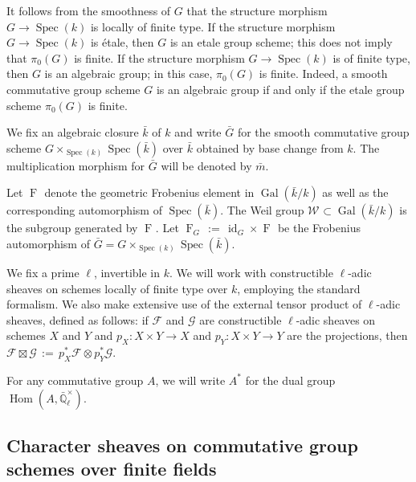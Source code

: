 \documentclass[10pt]{amsart}
\theoremstyle{plain}
\theoremstyle{definition}
\newcommand{\EE}{\mathbb{\bar Q}_\ell}
\newcommand{\bFq}{\bar{k}}
\newcommand{\Fq}{k}
\newcommand{\EEx}{\EE^\times}
\newcommand{\Weil}[1]{\mathcal{W}_{#1}}
\DeclareMathOperator{\Gal}{Gal}
\newcommand{\Frob}[1]{\operatorname{F}_{#1}}
\DeclareMathOperator{\Hom}{Hom}
\DeclareMathOperator{\id}{id}
\newcommand{\Spec}[1]{{\operatorname{Spec}(#1)}}
\newcommand{\ceq}{{\, :=\, }}
\newcommand{\bm}{\bar{m}}
\newcommand{\bG}{\bar{G}}
\begin{document}
It follows from the smoothness of $G$ that the structure morphism $G \to \Spec{\Fq}$ is locally of finite type.
If the structure morphism $G \to \Spec{\Fq}$ is \'etale, then $G$ is an etale group scheme; this does not imply that $\pi_0(G)$ is finite.
If the structure morphism $G \to \Spec{\Fq}$ is of finite type, then $G$ is an algebraic group; in this case, $\pi_0(G)$ is finite. 
Indeed, a smooth commutative group scheme $G$ is an algebraic group if and only if the etale group scheme $\pi_0(G)$ is finite.



 
We fix an algebraic closure $\bFq$ of $\Fq$ and write $\bG$ for the
smooth commutative group scheme $G \times_{\Spec{\Fq}} \Spec{\bFq}$ over $\bFq$
obtained by base change from $k$. The multiplication morphism for $\bG$ will be denoted by $\bm$.

Let $\Frob{}$ denote the geometric Frobenius element in $\Gal(\bFq/\Fq)$ as
well as the corresponding automorphism of $\Spec{\bFq}$. The Weil group
$\Weil{}\subset \Gal(\bFq/\Fq)$ is the subgroup generated by $\Frob{}$.
Let $\Frob{G} \ceq \id_{G} \times \Frob{}$ be the Frobenius automorphism of $\bG = G \times_{\Spec{\Fq}} \Spec{\bFq}$.

We fix a prime $\ell$, invertible in $\Fq$.
We will work with constructible $\ell$-adic sheaves 
on schemes locally of finite type over $\Fq$, employing the standard formalism.
We also make extensive use of the external tensor product of $\ell$-adic sheaves,
defined as follows: if $\mathcal{F}$ and $\mathcal{G}$ are constructible $\ell$-adic
sheaves on schemes $X$ and $Y$ and $p_X : X\times Y\to X$ and $p_Y : X\times Y \to Y$
are the projections, then $\mathcal{F}\boxtimes \mathcal{G} \ceq p_X^* \mathcal{F} \otimes p_Y^*\mathcal{G}$.

For any commutative group $A$, we will write $A^*$ for the dual group $\Hom(A, \EEx)$.

\subsection{Character sheaves on commutative group schemes over finite fields}\label{ssec:category}
\end{document}
